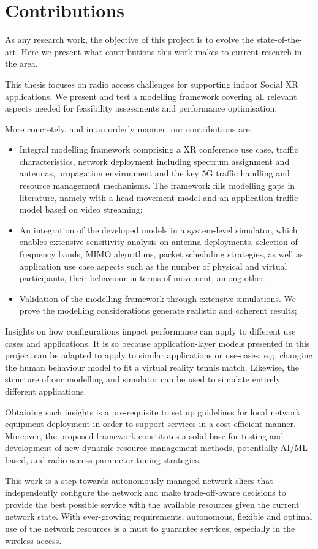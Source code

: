 \section{Contributions}
\label{sec:contributions}

As any research work, the objective of this project is to evolve the state-of-the-art. Here we present what contributions this work makes to current research in the area.

This thesis focuses on radio access challenges for supporting indoor Social XR applications. We present and test a modelling framework covering all relevant aspects needed for feasibility assessments and performance optimisation.

More concretely, and in an orderly manner, our contributions are:

\begin{itemize}
    \item Integral modelling framework comprising a XR conference use case, traffic characteristics, network deployment including spectrum assignment and antennas, propagation environment and the key 5G traffic handling and resource management mechanisms. The framework fills modelling gaps in literature, namely with a head movement model and an application traffic model based on video streaming;
    \item An integration of the developed models in a system-level simulator, which enables extensive sensitivity analysis on antenna deployments, selection of frequency bands, MIMO algorithms, packet scheduling strategies, as well as application use case aspects such as the number of physical and virtual participants, their behaviour in terms of movement, among other.
    \item Validation of the modelling framework through extensive simulations. We prove the modelling considerations generate realistic and coherent results;
\end{itemize}

Insights on how configurations impact performance can apply to different use cases and applications. It is so because application-layer models presented in this project can be adapted to apply to similar applications or use-cases, e.g. changing the human behaviour model to fit a virtual reality tennis match. Likewise, the structure of our modelling and simulator can be used to simulate entirely different applications. 

Obtaining such insights is a pre-requisite to set up guidelines for local network equipment deployment in order to support services in a cost-efficient manner. Moreover, the proposed framework constitutes a solid base for testing and development of new dynamic resource management methods, potentially \acs{AI}/\acs{ML}-based, and radio access parameter tuning strategies.

This work is a step towards autonomously managed network slices that independently configure the network and make trade-off-aware decisions to provide the best possible service with the available resources given the current network state. With ever-growing requirements, autonomous, flexible and optimal use of the network resources is a must to guarantee services, especially in the wireless access.


